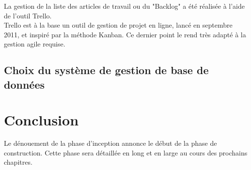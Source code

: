 \begin{spacing}{1.5}
La gestion de la liste des articles de travail ou du "Backlog" a été réalisée à l'aide de l'outil Trello.\\
Trello est à la base un outil de gestion de projet en ligne, lancé en septembre 2011, et inspiré par la méthode Kanban. Ce dernier point le rend très adapté à la gestion agile requise.

\subsection{Choix du système de gestion de base de données}


\section*{Conclusion}
Le dénouement de la phase d'inception annonce le début de la phase de construction. Cette phase sera détaillée en long et en large au cours des prochains chapitres.

\end{spacing}
